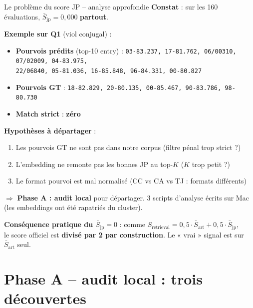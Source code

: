 \documentclass[aspectratio=169,10pt]{beamer}
\newcommand{\keybox}[1]{%
  \begin{center}
  \colorbox{accentsoft}{\parbox{0.92\linewidth}{\centering #1}}
  \end{center}}
\begin{document}
\begin{frame}{Le problème du score JP -- analyse approfondie}
  \footnotesize
  \textbf{Constat} : sur les 160 évaluations, $\bar{S}_{\text{jp}} = 0{,}000$ \textbf{partout}.

  \vspace{0.4em}
  \textbf{Exemple sur Q1} (viol conjugal) :
  \begin{itemize}\scriptsize
    \item \textbf{Pourvois prédits} (top-10 entry) : \texttt{03-83.237, 17-81.762, 06/00310, 07/02009, 04-83.975,\\22/06840, 05-81.036, 16-85.848, 96-84.331, 00-80.827}
    \item \textbf{Pourvois GT} : \texttt{18-82.829, 20-80.135, 00-85.467, 90-83.786, 98-80.730}
    \item \textbf{Match strict} : \textcolor{warn}{\textbf{zéro}}
  \end{itemize}

  \vspace{0.6em}
  \textbf{Hypothèses à départager} :
  \begin{enumerate}\footnotesize
    \item Les pourvois GT ne sont pas dans notre corpus (filtre pénal trop strict ?)
    \item L'embedding ne remonte pas les bonnes JP au top-$K$ ($K$ trop petit ?)
    \item Le format pourvoi est mal normalisé (CC vs CA vs TJ : formats différents)
  \end{enumerate}

  \vspace{0.4em}
  \keybox{$\Rightarrow$ \textbf{Phase A : audit local} pour départager. 3 scripts d'analyse écrits sur Mac (les embeddings ont été rapatriés du cluster).}

  \vspace{0.3em}
  \textbf{Conséquence pratique du \(\bar{S}_{\text{jp}} = 0\)} : comme \(S_{\text{retrieval}} = 0{,}5 \cdot \bar{S}_{\text{art}} + 0{,}5 \cdot \bar{S}_{\text{jp}}\), \\le score officiel est \textbf{divisé par 2 par construction}. Le « vrai » signal est sur \(\bar{S}_{\text{art}}\) seul.
\end{frame}

\section{Phase A -- audit local : trois découvertes}
\end{document}
